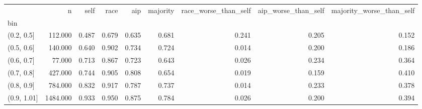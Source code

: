 \begin{tabular}{lrrrrrrrr}
\toprule
 & n & self & race & aip & majority & race\_worse\_than\_self & aip\_worse\_than\_self & majority\_worse\_than\_self \\
bin &  &  &  &  &  &  &  &  \\
\midrule
(0.2, 0.5] & 112.000 & 0.487 & 0.679 & 0.635 & 0.681 & 0.241 & 0.205 & 0.152 \\
(0.5, 0.6] & 140.000 & 0.640 & 0.902 & 0.734 & 0.724 & 0.014 & 0.200 & 0.186 \\
(0.6, 0.7] & 77.000 & 0.713 & 0.867 & 0.723 & 0.643 & 0.026 & 0.234 & 0.364 \\
(0.7, 0.8] & 427.000 & 0.744 & 0.905 & 0.808 & 0.654 & 0.019 & 0.159 & 0.410 \\
(0.8, 0.9] & 784.000 & 0.832 & 0.917 & 0.787 & 0.737 & 0.014 & 0.233 & 0.378 \\
(0.9, 1.01] & 1484.000 & 0.933 & 0.950 & 0.875 & 0.784 & 0.026 & 0.200 & 0.394 \\
\bottomrule
\end{tabular}
